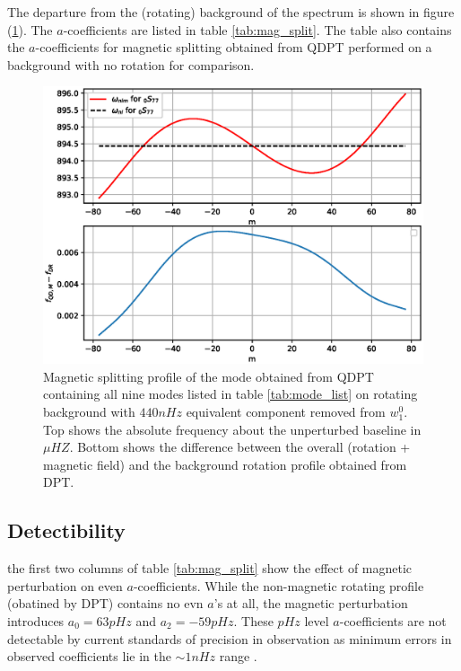 The departure from the (rotating) background of the spectrum is shown in figure (\ref{fig:mag_split}). The $a$-coefficients are listed in table \ref{tab:mag_split}. The table also contains the $a$-coefficients for magnetic splitting obtained from QDPT performed on a background with no rotation for comparison.

\begin{figure}[h!]
\includegraphics[scale=0.9, center]{Chapter4/figs/mag_split}
\caption{Magnetic splitting profile of the mode  obtained from QDPT containing all nine modes listed in table \ref{tab:mode_list} on rotating background with $440nHz$ equivalent component removed from $w_1^0$. Top shows the absolute frequency about the unperturbed baseline in $\mu HZ$. Bottom shows the difference between the overall (rotation + magnetic field) and the background rotation profile obtained from DPT.}
\label{fig:mag_split}
\end{figure}

\subsection{Detectibility}
the first two columns of table \ref{tab:mag_split} show the effect of magnetic perturbation on even $a$-coefficients. While the non-magnetic rotating profile (obatined by DPT) contains no evn $a$'s at all, the magnetic perturbation introduces $a_0=63 pHz$ and $a_2=-59pHz$. These $pHz$ level $a$-coefficients are not detectable by current standards of precision in observation as minimum errors in observed coefficients lie in the $\sim 1nHz$ range \cite{schou_data}.

